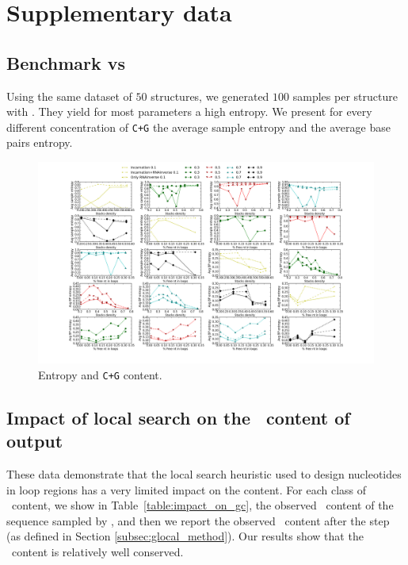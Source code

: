 \section{Supplementary data}
\subsection{Benchmark \ourprog vs \RNAinverse}
Using the same dataset of $50$ structures, we generated $100$ samples
per structure with \RNAinverse. They yield for most parameters
a high entropy. We present for every different concentration of \texttt{C+G}
the average sample entropy and the average base pairs entropy.


\begin{figure}[ht!]
	\hspace{-5em}
	\includegraphics[scale=0.4]{Figures/RNAinverse_data_100.png}
	\caption{Entropy and \texttt{C+G} content.}
	\label{fig:rnainverse}
\end{figure}

\subsection{Impact of local search on the \gc~content of \ourprog output}

These data demonstrate that the local search heuristic used to design nucleotides in loop regions has a very limited impact on the \gc content. For each class of \gc~content, we show in Table~\ref{table:impact_on_gc}, the observed \gc~content of the sequence sampled by \ourprog, and then we report the observed \gc~content after the \RNAinverse step (as defined in Section \ref{subsec:glocal_method}). Our results show that the \gc~content is relatively well conserved. 

